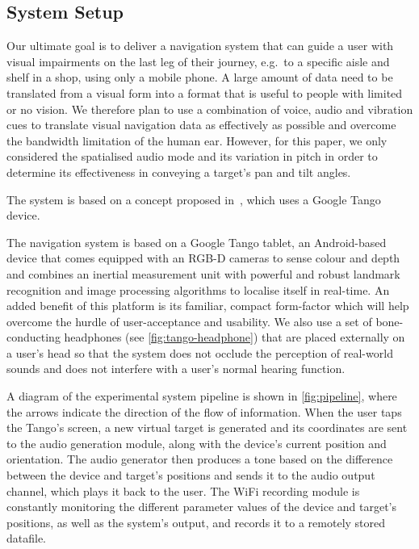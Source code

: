 \documentclass[sigconf, screen=true, anonymous=true]{acmart}
\begin{document}
\subsection{System Setup}

Our ultimate goal is to deliver a navigation system that can guide a user with visual impairments on the last leg of their journey, e.g.\ to a specific aisle and shelf in a shop, using only a mobile phone.
A large amount of data need to be translated from a visual form into a format that is useful to people with limited or no vision.
We therefore plan to use a combination of voice, audio and vibration cues to translate visual navigation data as effectively as possible and overcome the bandwidth limitation of the human ear. 
However, for this paper, we only considered the spatialised audio mode and its variation in pitch in order to determine its effectiveness in conveying a target's pan and tilt angles.

\begin{anonsuppress}
The system is based on a concept proposed in~\cite{bellotto2013, lock2017portable}, which uses a Google Tango device.
\end{anonsuppress}
The navigation system is based on a Google Tango tablet, an Android-based device that comes equipped with an RGB-D cameras to sense colour and depth and combines an inertial measurement unit with powerful and robust landmark recognition and image processing algorithms to localise itself in real-time.
An added benefit of this platform is its familiar, compact form-factor which will help overcome the hurdle of user-acceptance and usability.
We also use a set of bone-conducting headphones (see \cref{fig:tango-headphone}) that are placed externally on a user's head so that the system does not occlude the perception of real-world sounds and does not interfere with a user's normal hearing function.

A diagram of the experimental system pipeline is shown in \cref{fig:pipeline}, where the arrows indicate the direction of the flow of information.
When the user taps the Tango's screen, a new virtual target is generated and its coordinates are sent to the audio generation module, along with the device's current position and orientation.
The audio generator then produces a tone based on the difference between the device and target's positions and sends it to the audio output channel, which plays it back to the user.
The WiFi recording module is constantly monitoring the different parameter values of the device and target's positions, as well as the system's output, and records it to a remotely stored datafile. 
\end{document}
